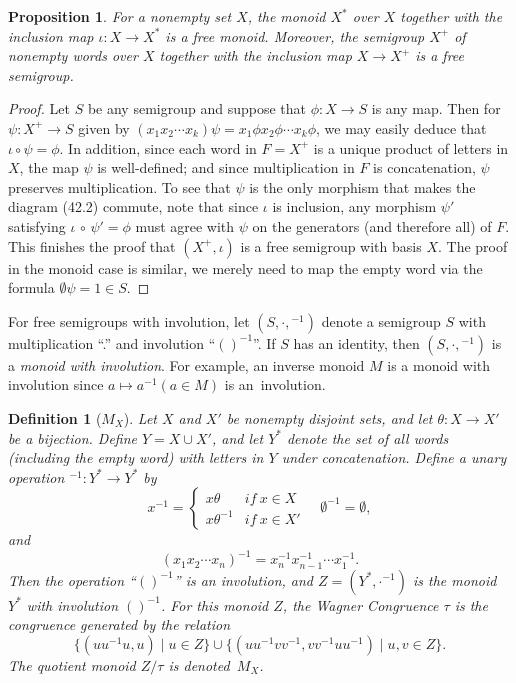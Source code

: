 \documentclass{surv-l}
\numberwithin{equation}{section}
\numberwithin{table}{section}
\numberwithin{figure}{section}
\newtheorem{proposition}[equation]{Proposition}
\newtheorem{definition}[equation]{Definition}
\theoremstyle{definition}
\begin{document}
\begin{proposition}\label{prop9.42.4}
For a nonempty set $X$, the monoid $X^{\ast}$ over $X$ together
with the inclusion map $\iota : X\rightarrow X^{\ast}$ is a free
monoid. Moreover, the semigroup $X^{+}$ of
nonempty words over $X$ together with the inclusion map
$X\rightarrow X^{+}$ is a free semigroup.
\end{proposition}

\begin{proof}
Let $S$ be any semigroup and suppose that $\phi : X\rightarrow S$
is any map. Then for $\psi : X^{+}\rightarrow S$ given by
$(x_{1}x_{2}\cdots x_{k})\psi=x_{1}\phi x_{2}\phi\cdots
x_{k}\phi$, we may easily deduce that $\iota \circ\psi=\phi$. In
addition, since each word in $F=X^{+}$ is a unique product of
letters in $X$, the map $\psi$ is well-defined; and since
multiplication in $F$ is concatenation, $\psi$ preserves
multiplication. To see that $\psi$ is the only morphism that makes
the diagram (42.2) commute, note that since $\iota$ is
inclusion, any morphism $\psi'$ satisfying $\iota\,\circ\,\psi'=\phi$
must agree with $\psi$ on the generators (and therefore all) of
$F$. This finishes the proof that $(X^{+}, \iota)$ is a free
semigroup with basis $X$. The proof in the monoid case is similar,
we merely need to map the empty word via the formula
$\emptyset\psi=1\in S$.
\end{proof}

For free semigroups with involution, let $(S,\cdot,{}^{-1})$ denote a semigroup $S$ with
multiplication ``.'' and involution ``$()^{-1}$''. If $S$ has an
identity, then $(S,\cdot,{}^{-1})$ is a \emph{monoid with
involution}. For example, an inverse monoid $M$ is a monoid with
involution since $a\mapsto a^{-1}(a\in M)$ is an~involution.

\begin{definition}[$M_{X}$]\label{defn42.5}
Let $X$ and $X'$ be nonempty disjoint sets, and let $\theta :
X\rightarrow X'$ be a bijection. Define $Y=X\cup X'$, and let
$Y^{\ast}$ denote the set of all words (including the empty word)
with letters in $Y$ under concatenation. Define a unary operation
${}^{-1}:Y^{\ast}\rightarrow Y^{\ast}$ by
\[
x^{-1}=\begin{cases}
x\theta &if\ x\in X\\
x\theta^{-1} &if\ x\in X'
\end{cases}\quad \emptyset^{-1}=\emptyset,
\]
and
\[
(x_{1}x_{2}\cdots x_{n})^{-1}=x_{n}^{-1}x_{n-1}^{-1}\cdots x_{1}^{-1}.
\]
Then the operation ``$()^{-1}$'' is an involution, and
$Z=(Y^{\ast},\cdot{}^{-1})$ is the monoid $Y^{\ast}$ with
involution $()^{-1}$. For this monoid $Z$, the Wagner
Congruence $\tau$ is the congruence
generated by the relation
\[
\{(uu^{-1}u, u)\mid u\in Z\} \cup \{(uu^{-1}vv^{-1},
vv^{-1}uu^{-1})\mid u, v\in Z\}.
\]
The quotient monoid $Z/\tau$ is denoted~$M_{X}$.
\end{definition}
\end{document}
